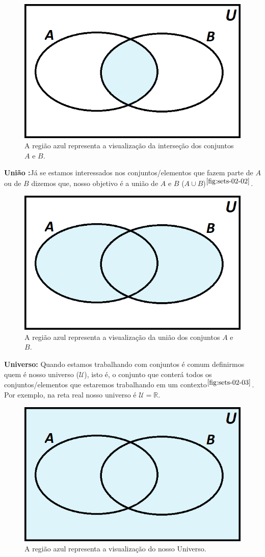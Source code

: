     \begin{figure}[hbt!]
        \centering      
        \includegraphics[width = 7.5 cm]{figures/sets/fig-sets-02-01.png}
        \caption{A região azul representa a visualização da interseção dos conjuntos $A$ e $B$.}
        \label{fig:sets-02-01}
    \end{figure}
    
    \textbf{União :}Já se estamos interessados nos conjuntos/elementos que fazem parte de $A$ ou de $B$ dizemos que, nosso objetivo é a união de $A$ e $B$ ($A \cup B$)$^{\ref{fig:sets-02-02}}$.
    
    \begin{figure}[hbt!]
        \centering      
        \includegraphics[width = 7.5 cm]{figures/sets/fig-sets-02-02.png}
        \caption{A região azul representa a visualização da união dos conjuntos $A$ e $B$.}
        \label{fig:sets-02-02}
    \end{figure}
    
    \textbf{Universo:} Quando estamos trabalhando com conjuntos é comum definirmos quem é nosso universo ($ \mathcal U $), isto é, o conjunto que conterá todos os conjuntos/elementos que estaremos trabalhando em um contexto$^{\ref{fig:sets-02-03}}$. Por exemplo, na reta real nosso universo é $\mathcal U = \mathbb{R}$.
    
    \begin{figure}[hbt!]
        \centering      
        \includegraphics[width = 7.5 cm]{figures/sets/fig-sets-02-03.png}
        \caption{A região azul representa a visualização do nosso Universo.}
        \label{fig:sets-02-03}
    \end{figure}
    
